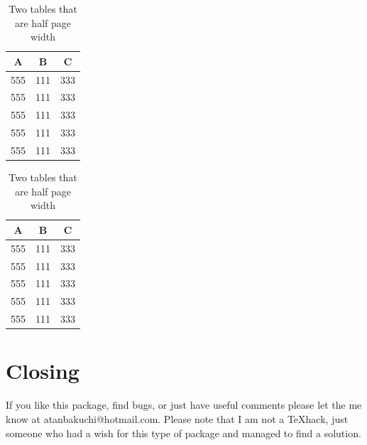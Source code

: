 \documentclass{article}
\begin{document}
\begin{table}
    \caption{Two tables that are half page width}\label{tab:1}
\begin{tabular*}{\figwidth}{ccc}
\hline
  A & B & C \\ \hline
  555 & 111 & 333 \\
  555 & 111 & 333 \\
  555 & 111 & 333 \\
  555 & 111 & 333 \\
  555 & 111 & 333 \\
      \hline
 \end{tabular*}
    \hfill
\begin{tabular*}{\figwidth}{ccc}
\hline
  A & B & C \\ \hline
  555 & 111 & 333 \\
  555 & 111 & 333 \\
  555 & 111 & 333 \\
  555 & 111 & 333 \\
  555 & 111 & 333 \\
      \hline
 \end{tabular*}

\end{table}



\section{Closing}
If you like this package, find bugs, or just have useful comments
please let the me know at atanbakuchi@hotmail.com.  Please note
that I am not a \TeX hack, just someone who had a wish for this
type of package and managed to find a solution.
\end{document}
